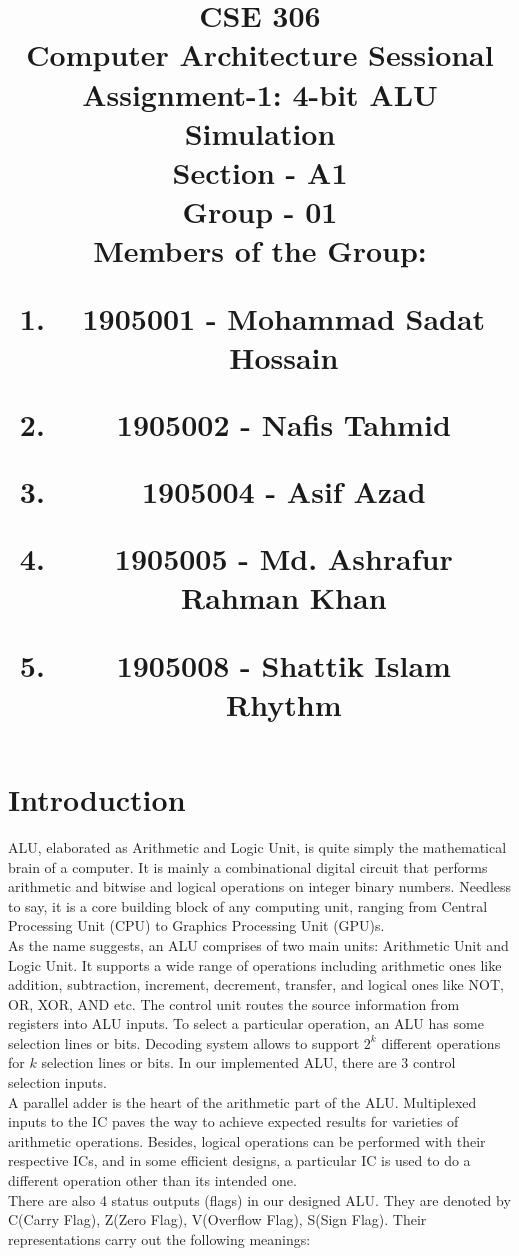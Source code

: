 \documentclass[12pt]{article}
\title{CSE 306 \\
Computer Architecture Sessional \\
\vspace{10mm}
Assignment-1: 4-bit ALU Simulation \\
\vspace{20mm}
Section - A1 \\
Group - 01 \\
\vspace{15mm}
\RaggedRight
Members of the Group: \\
\normalsize	{
\begin{enumerate}[label=\roman*]
    \item 1905001 - Mohammad Sadat Hossain
    \item 1905002 - Nafis Tahmid
    \item 1905004 - Asif Azad
    \item 1905005 - Md. Ashrafur Rahman Khan
    \item 1905008 - Shattik Islam Rhythm
\end{enumerate}
}
}
\author{}
\date{}
\begin{document}
\maketitle

\newpage
\section{\large{Introduction}}
ALU, elaborated as Arithmetic and Logic Unit, is quite simply the mathematical brain of a computer. It is mainly a combinational digital circuit that performs arithmetic and bitwise and logical operations on integer binary numbers. Needless to say, it is a core building block of any computing unit, ranging from Central Processing Unit (CPU) to Graphics Processing Unit (GPU)s.\\
As the name suggests, an ALU comprises of two main units: Arithmetic Unit and Logic Unit. It supports a wide range of operations including arithmetic ones like addition, subtraction, increment, decrement, transfer, and logical ones like NOT, OR, XOR, AND etc. The control unit routes the source information from registers into ALU inputs. To select a particular operation, an ALU has some selection lines or bits. Decoding system allows to support $2^k$ different operations for $k$ selection lines or bits. In our implemented ALU, there are $3$ control selection inputs.\\
A parallel adder is the heart of the arithmetic part of the ALU.
Multiplexed inputs to the IC paves the way to achieve expected results for varieties of arithmetic operations. Besides, logical operations can be performed with their respective ICs, and in some efficient designs, a particular IC is used to do a different operation other than its intended one.\\
There are also 4 status outputs (flags) in our designed ALU. They are denoted by C(Carry Flag), Z(Zero Flag), V(Overflow Flag), S(Sign Flag). Their representations carry out the following meanings:
\end{document}

